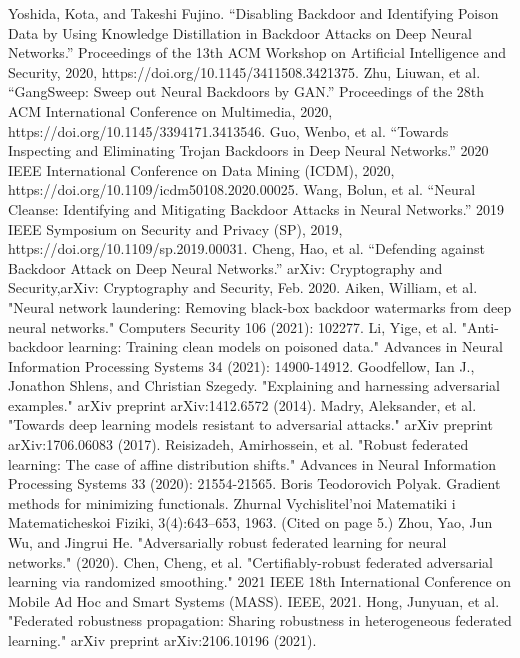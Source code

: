 \documentclass[conference]{IEEEtran}
\begin{document}
\begin{thebibliography}{00}
     Yoshida, Kota, and Takeshi Fujino. “Disabling Backdoor and Identifying Poison Data by Using Knowledge Distillation in Backdoor Attacks on Deep Neural Networks.” Proceedings of the 13th ACM Workshop on Artificial Intelligence and Security, 2020, https://doi.org/10.1145/3411508.3421375.
     Zhu, Liuwan, et al. “GangSweep: Sweep out Neural Backdoors by GAN.” Proceedings of the 28th ACM International Conference on Multimedia, 2020, https://doi.org/10.1145/3394171.3413546.
     Guo, Wenbo, et al. “Towards Inspecting and Eliminating Trojan Backdoors in Deep Neural Networks.” 2020 IEEE International Conference on Data Mining (ICDM), 2020, https://doi.org/10.1109/icdm50108.2020.00025.
     Wang, Bolun, et al. “Neural Cleanse: Identifying and Mitigating Backdoor Attacks in Neural Networks.” 2019 IEEE Symposium on Security and Privacy (SP), 2019, https://doi.org/10.1109/sp.2019.00031.
     Cheng, Hao, et al. “Defending against Backdoor Attack on Deep Neural Networks.” arXiv: Cryptography and Security,arXiv: Cryptography and Security, Feb. 2020.
     Aiken, William, et al. "Neural network laundering: Removing black-box backdoor watermarks from deep neural networks." Computers  Security 106 (2021): 102277.
     Li, Yige, et al. "Anti-backdoor learning: Training clean models on poisoned data." Advances in Neural Information Processing Systems 34 (2021): 14900-14912.
     Goodfellow, Ian J., Jonathon Shlens, and Christian Szegedy. "Explaining and harnessing adversarial examples." arXiv preprint arXiv:1412.6572 (2014).
     Madry, Aleksander, et al. "Towards deep learning models resistant to adversarial attacks." arXiv preprint arXiv:1706.06083 (2017).
     Reisizadeh, Amirhossein, et al. "Robust federated learning: The case of affine distribution shifts." Advances in Neural Information Processing Systems 33 (2020): 21554-21565.
     Boris Teodorovich Polyak. Gradient methods for minimizing functionals. Zhurnal Vychislitel'noi Matematiki i Matematicheskoi Fiziki, 3(4):643–653, 1963. (Cited on page 5.)
     Zhou, Yao, Jun Wu, and Jingrui He. "Adversarially robust federated learning for neural networks." (2020).
     Chen, Cheng, et al. "Certifiably-robust federated adversarial learning via randomized smoothing." 2021 IEEE 18th International Conference on Mobile Ad Hoc and Smart Systems (MASS). IEEE, 2021.
     Hong, Junyuan, et al. "Federated robustness propagation: Sharing robustness in heterogeneous federated learning." arXiv preprint arXiv:2106.10196 (2021).

\end{thebibliography}
\end{document}
